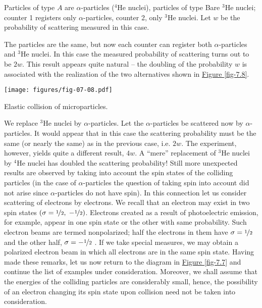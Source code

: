 \documentclass[a4paper,sfsidenotes,colorlinks=true]{tufte-book}
\numberwithin{equation}{section}
\numberwithin{figure}{section}
\begin{document}
\begin{description}[font=\bfseries, leftmargin=1cm]
\item[First Example.] Particles of type $A$ are $\alpha$-particles
  ($^{4}$He nuclei), particles of type Bare $^{3}$He nuclei; counter
  \textsf{1} registers only $\alpha$-particles, counter \textsf{2},
  only $^{3}$He nuclei. Let $w$ be the probability of scattering
  measured in this case.

\item[Second example.] The particles are the same, but now each
  counter can register both $\alpha$-particles and $^{3}$He nuclei. In
  this case the measured probability of scattering turns out to be
  $2w$. This result appears quite natural -- the doubling of the probability $w$ is associated with the realization of the two alternatives shown in \hyperref[fig-7.8]{Figure \ref{fig-7.8}}.

\begin{marginfigure}%
\centering
\texttt{[image: figures/fig-07-08.pdf]}
\caption{Elastic collision of microparticles.}
\label{fig-7.8}
\end{marginfigure}

\item[Third example.] We replace $^{3}$He nuclei by
  $\alpha$-particles. Let the $\alpha$-particles be scattered now by
  $\alpha$-particles. It would appear that in this case the scattering
  probability must be the same (or nearly the same) as in the previous
  case, i.e. $2w$. The experiment, however, yields quite a different
  result, $4w$. A ``mere'' replacement of $^{3}$He nuclei by $^{4}$He
  nuclei has doubled the scattering probability! Still more unexpected
  results are observed by taking into account the spin states of the
  colliding particles (in the case of $\alpha$-particles the question
  of taking spin into account did not arise since $\alpha$-particles
  do not have spin). In this connection let us consider scattering of
  electrons by electrons. We recall that an electron may exist in two
  spin states $ \left( \sigma = \nicefrac{1}{2}, \; -\nicefrac{1}{2}
  \right) $. Electrons created as a result of photoelectric emission,
  for example, appear in one spin state or the other with same
  probability. Such electron beams are termed nonpolarized; half the
  electrons in them have $\sigma = \nicefrac{1}{2}$ and the other
  half, $\sigma = - \nicefrac{1}{2}$ . If we take special measures, we
  may obtain a polarized electron beam in which all electrons are in
  the same spin state. Having made these remarks, let us now return to
  the diagram in \hyperref[fig-7.7]{Figure \ref{fig-7.7}} and continue
  the list of examples under consideration. Moreover, we shall assume
  that the energies of the colliding particles are considerably small,
  hence, the possibility of an electron changing its spin state upon
  collision need not be taken into consideration.



\end{description}
\end{document}

